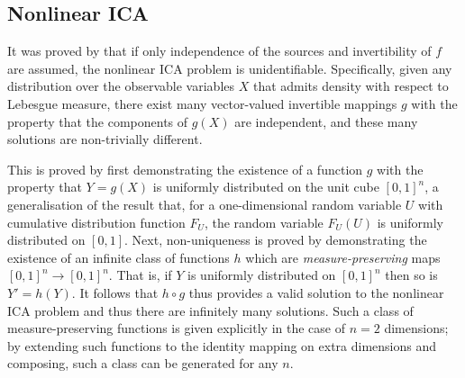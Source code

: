 \subsection{Nonlinear ICA}\label{subsec:ica-literature-nonlinear-ica}
 
It was proved by \cite{hyvarinen1999nonlinear} that if only independence of the sources and invertibility of $f$ are assumed, the nonlinear ICA problem is unidentifiable.
Specifically, given any distribution over the observable variables $X$ that admits density with respect to Lebesgue measure, there exist many vector-valued invertible mappings $g$ with the property that the components of $g(X)$ are independent, and these many solutions are non-trivially different.

This is proved by first demonstrating the existence of a function $g$ with the property that $Y=g(X)$ is uniformly distributed on the unit cube $[0, 1]^n$,
a generalisation of the result that, for a one-dimensional random variable $U$  with cumulative distribution function $F_U$, the random variable $F_U(U)$ is uniformly distributed on $[0,1]$.
Next, non-uniqueness is proved by demonstrating the existence of an infinite class of functions $h$ which are \emph{measure-preserving} maps $[0,1]^n \to [0,1]^n$. 
That is, if $Y$ is uniformly distributed on $[0,1]^n$ then so is  $Y' = {h}({Y})$.
It follows that ${h}\circ {g}$ thus provides a valid solution to the nonlinear ICA problem and thus there are infinitely many solutions. 
Such a class of measure-preserving functions is given explicitly in the case of $n=2$ dimensions; by extending such functions to the identity mapping on extra dimensions and composing, such a class can be generated for any $n$.

